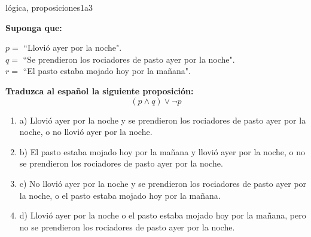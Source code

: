 \documentclass{article}
\begin{document}
\begin{question}{3}{lógica, proposiciones}{1}{a}{3}{
\textbf{Suponga que:} \smallskip

\(p = \) ``Llovió ayer por la noche".\\
\(q = \) ``Se prendieron los rociadores de pasto ayer por la noche".\\
\(r = \) ``El pasto estaba mojado hoy por la mañana".\smallskip

\textbf{Traduzca al español la siguiente proposición:}
\[
(p \land q) \lor \neg p
\]

\begin{enumerate}
   \item a) Llovió ayer por la noche y se prendieron los rociadores de pasto ayer por la noche, o no llovió ayer por la noche.
   \item b) El pasto estaba mojado hoy por la mañana y llovió ayer por la noche, o no se prendieron los rociadores de pasto ayer por la noche.
   \item c) No llovió ayer por la noche y se prendieron los rociadores de pasto ayer por la noche, o el pasto estaba mojado hoy por la mañana.
   \item d) Llovió ayer por la noche o el pasto estaba mojado hoy por la mañana, pero no se prendieron los rociadores de pasto ayer por la noche.
\end{enumerate}
}
\end{question}
\end{document}
